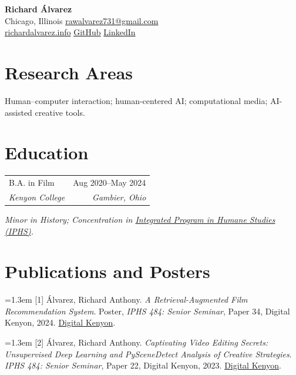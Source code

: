\documentclass[letterpaper,11pt]{article}
\makeatletter
\newcommand{\cventry}[4]{
  \Needspace{9\baselineskip}
  \begin{tabularx}{\textwidth}{@{}X@{\hspace{1em}}r@{}}
    #1 & #2 \\
    \textit{#3} & \textit{#4}
  \end{tabularx}
}
\newcommand{\contactsep}{\hspace{0.8em}\raisebox{0.18ex}{\fontsize{5}{5}\selectfont$\circ$}\hspace{0.8em}}
\makeatother
\begin{document}
{\fontsize{17pt}{19pt}\selectfont\textbf{Richard Álvarez}}\\[3pt]
{\small
Chicago, Illinois\contactsep%
\href{mailto:rawalvarez731@gmail.com}{rawalvarez731@gmail.com}\\[-1pt]
\href{https://richardalvarez.info}{richardalvarez.info}\contactsep%
\href{https://github.com/raulduk3}{GitHub}\contactsep%
\href{https://www.linkedin.com/in/richardalvarez-/}{LinkedIn}}

\section{Research Areas}
Human--computer interaction; human-centered AI; computational media; AI-assisted creative tools.

\section{Education}
\cventry
  {B.A. in Film}
  {Aug 2020--May 2024}
  {Kenyon College}
  {Gambier, Ohio}
\textit{Minor in History; Concentration in \href{https://humanestudies.org/}{Integrated Program in Humane Studies (IPHS)}.}\par

\section{Publications and Posters}
\hangindent=1.3em 
[1] Álvarez, Richard Anthony. \textit{A Retrieval-Augmented Film Recommendation System}. Poster, \textit{IPHS 484: Senior Seminar}, Paper 34, Digital Kenyon, 2024. \href{https://digital.kenyon.edu/dh_iphs_ss/34/}{Digital Kenyon}.\par\vspace{3pt}
\hangindent=1.3em 
[2] Álvarez, Richard Anthony. \textit{Captivating Video Editing Secrets: Unsupervised Deep Learning and PySceneDetect Analysis of Creative Strategies}. \textit{IPHS 484: Senior Seminar}, Paper 22, Digital Kenyon, 2023. \href{https://digital.kenyon.edu/dh_iphs_ss/22/}{Digital Kenyon}.\par
\end{document}
